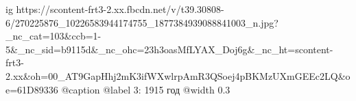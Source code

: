  
 
 
 
 

\ifcmt
  ig https://scontent-frt3-2.xx.fbcdn.net/v/t39.30808-6/270225876_10226583944174755_1877384939088841003_n.jpg?_nc_cat=103&ccb=1-5&_nc_sid=b9115d&_nc_ohc=23h3oasMfLYAX_Doj6g&_nc_ht=scontent-frt3-2.xx&oh=00_AT9GapHhj2mK3ifWXwlrpAmR3QSoej4pBKMzUXmGEEc2LQ&oe=61D89336
	@caption @label 3: 1915 год
  @width 0.3
\fi
